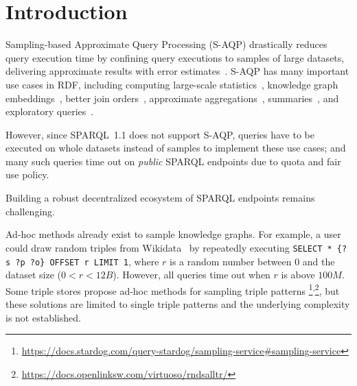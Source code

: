 
\section{Introduction}

Sampling-based Approximate Query Processing (S-AQP) drastically
reduces query execution time by confining query executions to samples
of large datasets, delivering approximate results with error
estimates~\cite{DBLP:conf/sigmod/AgarwalMKTJMMS14}. S-AQP has many
important use cases in RDF, including computing large-scale
statistics~\cite{soulet2019anytime,10.1007/978-3-319-18818-8_14},
knowledge graph embeddings~\cite{ristoski2016rdf2vec}, better join
orders~\cite{DBLP:conf/cidr/LeisRGK017}, approximate
aggregations~\cite{wang2022approximate},
summaries~\cite{10.1007/978-3-030-49461-2_10}, and exploratory
queries~\cite{DBLP:conf/sigmod/AgarwalMKTJMMS14}.
%



However, since SPARQL~1.1 does not support S-AQP, queries have to be
executed on whole datasets instead of samples to implement these use
cases; and many such queries time out on \emph{public} SPARQL
endpoints due to quota and fair use policy.

Building a robust decentralized ecosystem of SPARQL endpoints remains
challenging.

%
Ad-hoc methods already exist to sample knowledge graphs.  For example,
a user could draw random triples from
Wikidata~\cite{soulet2019anytime} by repeatedly executing
\verb|SELECT * {?s ?p ?o} OFFSET r LIMIT 1|, where $r$ is a random
number between $0$ and the dataset size ($0<r<12B$). However, all
queries time out when $r$ is above $100M$.
Some triple stores propose ad-hoc methods for sampling triple
patterns%
\footnote{\url{https://docs.stardog.com/query-stardog/sampling-service\#sampling-service}}\textsuperscript{,}\footnote{\url{https://docs.openlinksw.com/virtuoso/rndsalltr/}},
but these solutions are limited to single triple patterns and the
underlying complexity is not established.
%

